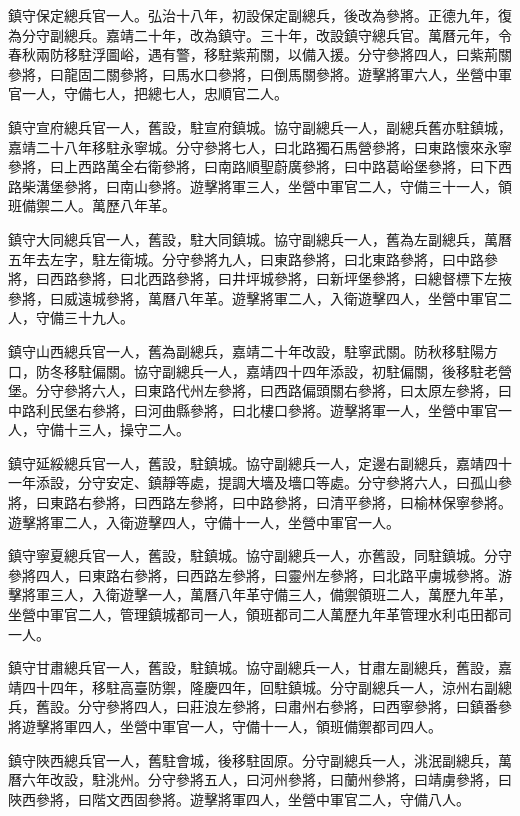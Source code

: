 鎮守保定總兵官一人。弘治十八年，初設保定副總兵，後改為參將。正德九年，復為分守副總兵。嘉靖二十年，改為鎮守。三十年，改設鎮守總兵官。萬曆元年，令春秋兩防移駐浮圖峪，遇有警，移駐紫荊關，以備入援。分守參將四人，曰紫荊關參將，曰龍固二關參將，曰馬水口參將，曰倒馬關參將。遊擊將軍六人，坐營中軍官一人，守備七人，把總七人，忠順官二人。

鎮守宣府總兵官一人，舊設，駐宣府鎮城。協守副總兵一人，副總兵舊亦駐鎮城，嘉靖二十八年移駐永寧城。分守參將七人，曰北路獨石馬營參將，曰東路懷來永寧參將，曰上西路萬全右衛參將，曰南路順聖蔚廣參將，曰中路葛峪堡參將，曰下西路柴溝堡參將，曰南山參將。遊擊將軍三人，坐營中軍官二人，守備三十一人，領班備禦二人。萬歷八年革。

鎮守大同總兵官一人，舊設，駐大同鎮城。協守副總兵一人，舊為左副總兵，萬曆五年去左字，駐左衛城。分守參將九人，曰東路參將，曰北東路參將，曰中路參將，曰西路參將，曰北西路參將，曰井坪城參將，曰新坪堡參將，曰總督標下左掖參將，曰威遠城參將，萬曆八年革。遊擊將軍二人，入衛遊擊四人，坐營中軍官二人，守備三十九人。

鎮守山西總兵官一人，舊為副總兵，嘉靖二十年改設，駐寧武關。防秋移駐陽方口，防冬移駐偏關。協守副總兵一人，嘉靖四十四年添設，初駐偏關，後移駐老營堡。分守參將六人，曰東路代州左參將，曰西路偏頭關右參將，曰太原左參將，曰中路利民堡右參將，曰河曲縣參將，曰北樓口參將。遊擊將軍一人，坐營中軍官一人，守備十三人，操守二人。

鎮守延綏總兵官一人，舊設，駐鎮城。協守副總兵一人，定邊右副總兵，嘉靖四十一年添設，分守安定、鎮靜等處，提調大墻及墻口等處。分守參將六人，曰孤山參將，曰東路右參將，曰西路左參將，曰中路參將，曰清平參將，曰榆林保寧參將。遊擊將軍二人，入衛遊擊四人，守備十一人，坐營中軍官一人。

鎮守寧夏總兵官一人，舊設，駐鎮城。協守副總兵一人，亦舊設，同駐鎮城。分守參將四人，曰東路右參將，曰西路左參將，曰靈州左參將，曰北路平虜城參將。游擊將軍三人，入衛遊擊一人，萬曆八年革守備三人，備禦領班二人，萬歷九年革，坐營中軍官二人，管理鎮城都司一人，領班都司二人萬歷九年革管理水利屯田都司一人。

鎮守甘肅總兵官一人，舊設，駐鎮城。協守副總兵一人，甘肅左副總兵，舊設，嘉靖四十四年，移駐高臺防禦，隆慶四年，回駐鎮城。分守副總兵一人，涼州右副總兵，舊設。分守參將四人，曰莊浪左參將，曰肅州右參將，曰西寧參將，曰鎮番參將遊擊將軍四人，坐營中軍官一人，守備十一人，領班備禦都司四人。

鎮守陜西總兵官一人，舊駐會城，後移駐固原。分守副總兵一人，洮泯副總兵，萬曆六年改設，駐洮州。分守參將五人，曰河州參將，曰蘭州參將，曰靖虜參將，曰陜西參將，曰階文西固參將。遊擊將軍四人，坐營中軍官二人，守備八人。


